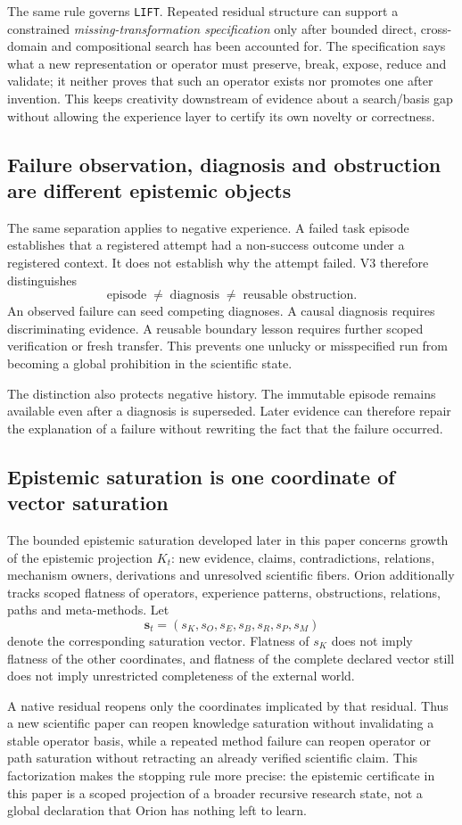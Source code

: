 The same rule governs \texttt{LIFT}. Repeated residual structure can support a constrained \emph{missing-transformation specification} only after bounded direct, cross-domain and compositional search has been accounted for. The specification says what a new representation or operator must preserve, break, expose, reduce and validate; it neither proves that such an operator exists nor promotes one after invention. This keeps creativity downstream of evidence about a search/basis gap without allowing the experience layer to certify its own novelty or correctness.

\subsection{Failure observation, diagnosis and obstruction are different epistemic objects}

The same separation applies to negative experience. A failed task episode establishes that a registered attempt had a non-success outcome under a registered context. It does not establish why the attempt failed. V3 therefore distinguishes
\[
\text{episode}\;\neq\;\text{diagnosis}\;\neq\;\text{reusable obstruction}.
\]
An observed failure can seed competing diagnoses. A causal diagnosis requires discriminating evidence. A reusable boundary lesson requires further scoped verification or fresh transfer. This prevents one unlucky or misspecified run from becoming a global prohibition in the scientific state.

The distinction also protects negative history. The immutable episode remains available even after a diagnosis is superseded. Later evidence can therefore repair the explanation of a failure without rewriting the fact that the failure occurred.

\subsection{Epistemic saturation is one coordinate of vector saturation}

The bounded epistemic saturation developed later in this paper concerns growth of the epistemic projection $K_t$: new evidence, claims, contradictions, relations, mechanism owners, derivations and unresolved scientific fibers. Orion additionally tracks scoped flatness of operators, experience patterns, obstructions, relations, paths and meta-methods. Let
\[
\mathbf s_t=(s_K,s_O,s_E,s_B,s_R,s_P,s_M)
\]
denote the corresponding saturation vector. Flatness of $s_K$ does not imply flatness of the other coordinates, and flatness of the complete declared vector still does not imply unrestricted completeness of the external world.

A native residual reopens only the coordinates implicated by that residual. Thus a new scientific paper can reopen knowledge saturation without invalidating a stable operator basis, while a repeated method failure can reopen operator or path saturation without retracting an already verified scientific claim. This factorization makes the stopping rule more precise: the epistemic certificate in this paper is a scoped projection of a broader recursive research state, not a global declaration that Orion has nothing left to learn.
